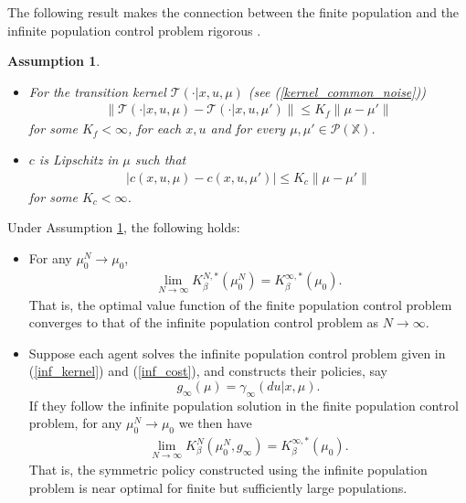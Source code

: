 \documentclass[twoside,11pt]{article}
\newtheorem{assumption}{Assumption}[section]
\def\P{{\mathcal P}}
\begin{document}
The following result makes the connection between the finite population and the infinite population control problem rigorous \cite{motte2022mean,bauerle2021mean,bayraktar2023infinite}.



\begin{assumption}\label{main_assmp}
\begin{itemize}
\item[i.] For the transition kernel $\mathcal{T}(\cdot|x,u,\mu)$ (see (\ref{kernel_common_noise}))
\begin{align*}
\|\mathcal{T}(\cdot|x,u,\mu) - \mathcal{T}(\cdot|x,u,\mu')\| \leq K_f \|\mu-\mu'\|
\end{align*} 
for some $K_f<\infty$, for each $x,u$ and for every $\mu,\mu'\in\P(\mathds{X})$.
\item[ii] $c$ is  Lipschitz in $\mu$ such that
\begin{align*}
|c(x,u,\mu)-c(x,u,\mu')|\leq K_c \|\mu-\mu'\|
\end{align*}
for some $K_c<\infty$.
\end{itemize}
\end{assumption}



\begin{theorem}
Under Assumption \ref{main_assmp}, the following holds:
\begin{itemize}
\item[i.] For any $\mu_0^N \to \mu_0$, 
\begin{align*}
\lim_{N\to\infty} K_\beta^{N,*}(\mu_0^N) = K_\beta^{\infty,*}(\mu_0).
\end{align*}
That is, the optimal value function of the finite population control problem converges to that of the infinite population control problem as $N\to\infty$.
\item[ii.] Suppose each agent solves the infinite population control problem given in (\ref{inf_kernel}) and (\ref{inf_cost}), and constructs their policies, say $$g_\infty(\mu)=\gamma_\infty(du|x,\mu).$$ If they follow the infinite population solution in the finite population control problem, for any $\mu_0^N \to \mu_0$ we then have
\begin{align*}
\lim_{N\to\infty} K_\beta^{N}(\mu_0^N,g_\infty) = K_\beta^{\infty,*}(\mu_0).
\end{align*}
That is, the symmetric policy constructed using the infinite population problem is near optimal for finite but sufficiently large populations.  
\end{itemize}
\end{theorem}
\end{document}
